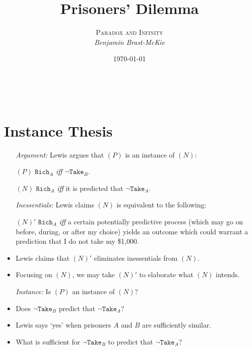 \documentclass[a4paper, 11pt]{article} %
\title{\textbf{Prisoners' Dilemma}} %
\author{\textsc{Paradox and Infinity}\\ \em Benjamin Brast-McKie} %
\date{\today} %
\makeatletter
\renewcommand{\maketitle}{ %
\begin{flushright} %
{\LARGE\@title} %

\vspace{10pt} %

{\@author} %
\\\@date %

\vspace{-10pt} %
\end{flushright}
}
\makeatother
\begin{document}
\maketitle %

\thispagestyle{empty}



\section*{Instance Thesis}

\begin{itemize}
  \item[\it Argument:] Lewis argues that $(P)$ is an instance of $(N)$:
    \item[$(P)$] $\texttt{Rich}_A$ \textit{iff} $\neg \texttt{Take}_B$.
    \item[$(N)$] $\texttt{Rich}_A$ \textit{iff} it is predicted that $\neg \texttt{Take}_A$.
  \item[\it Inessentials:] Lewis claims $(N)$ is equivalent to the following:
    \item[$(N)'$] $\texttt{Rich}_A$ \textit{iff} a certain potentially predictive process (which may go on before, during, or after my choice) yields an outcome which could warrant a prediction that I do not take my \$1,000.
    \item Lewis claims that $(N)'$ eliminates inessentials from $(N)$.
    \item Focusing on $(N)$, we may take $(N)'$ to elaborate what $(N)$ intends.
  \item[\it Instance:] Is $(P)$ an instance of $(N)$?
    \item Does $\neg \texttt{Take}_B$ predict that $\neg \texttt{Take}_A$? 
    \item Lewis says `yes' when prisoners $A$ and $B$ are sufficiently similar. 
    \item What is sufficient for $\neg \texttt{Take}_B$ to predict that $\neg \texttt{Take}_A$?
\end{itemize}
\end{document}
